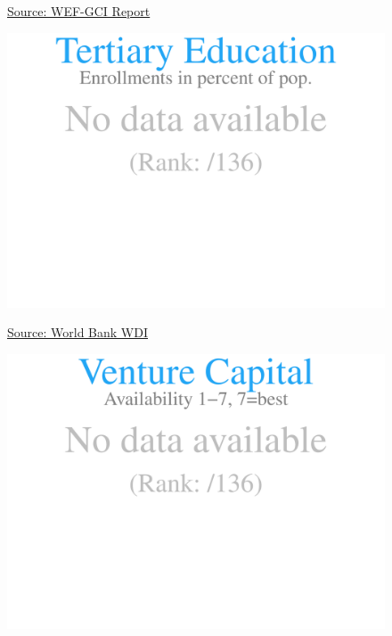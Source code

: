 \documentclass{article}\usepackage[]{graphicx}\usepackage[]{color}
\makeatletter
\def\maxwidth{ %
  \ifdim\Gin@nat@width>\linewidth
    \linewidth
  \else
    \Gin@nat@width
  \fi
}
\makeatother
\begin{document}
\begin{figure}
\begin{minipage}[t]{0.99\textwidth}
\begin{minipage}[t]{0.56\textwidth}
\begin{minipage}[c]{0.30\textwidth}
{}



    \vspace{-2ex}
    \hspace{2ex}\tiny{\href{http://reports.weforum.org/global-competitiveness-index/}{\textcolor[HTML]{22A6F5}{Source: WEF-GCI Report}}}
    \end{minipage}
    \begin{minipage}[c]{0.30\textwidth}


{\centering \includegraphics[width=\maxwidth]{figure/figure_sparkline5-1} 

}



    \vspace{-2ex}
    \hspace{2ex}\tiny{\href{http://data.worldbank.org}{\textcolor[HTML]{22A6F5}{Source: World Bank WDI}}}
    \end{minipage}
    \begin{minipage}[c]{0.30\textwidth}


{\centering \includegraphics[width=\maxwidth]{figure/figure_sparkline6-1} 

}
\end{minipage}
\end{minipage}
\end{minipage}
\end{figure}
\end{document}
